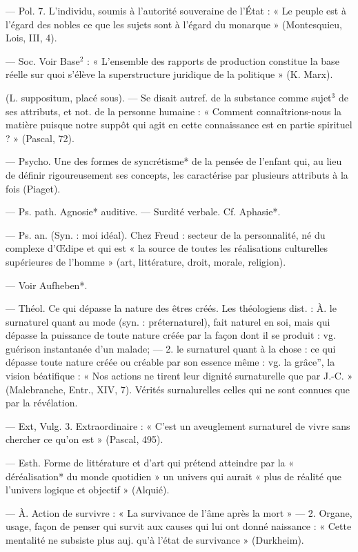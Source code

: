 \begin{itemize}[leftmargin=1cm, label=, itemsep=1pt]
— Pol. 7. L’individu, soumis à
l'autorité souveraine de l'État : « Le
peuple est à l’égard des nobles ce
que les sujets sont à l'égard du
monarque » (Montesquieu, Lois,
III, 4).

 — Soc. Voir Base$^2$ :
« L'ensemble des rapports de production constitue la base réelle sur
quoi s'élève la superstructure juridique de la politique » (K. Marx).

 (L. suppositum, placé sous). —
Se disait autref. de la substance
comme sujet$^3$ de ses attributs, et
not. de la personne humaine : « Comment connaîtrions-nous la matière
puisque notre suppôt qui agit en
cette connaissance est en partie spirituel ? » (Pascal, 72).

 — Psycho. Une des
formes de syncrétisme* de la pensée
de l'enfant qui, au lieu de définir
rigoureusement ses concepts, les
caractérise par plusieurs attributs à
la fois (Piaget).

 — Ps. path. Agnosie* auditive. — Surdité verbale. Cf.
Aphasie*.

 — Ps. an. (Syn. : moi idéal).
Chez Freud : secteur de la personnalité, né du complexe d'Œdipe et
qui est « la source de toutes les réalisations culturelles supérieures de
l’homme » (art, littérature, droit,
morale, religion).

 — Voir Aufheben*.

 — Théol. Ce qui dépasse
la nature des êtres créés. Les théologiens dist. : À. le surnaturel quant
au mode (syn. : préternaturel), fait
naturel en soi, mais qui dépasse la
puissance de toute nature créée
par la façon dont il se produit : vg.
guérison instantanée d'un malade;
— 2. le surnaturel quant à la chose :
ce qui dépasse toute nature créée ou
créable par son essence même : vg.
la grâce”, la vision béatifique : « Nos
actions ne tirent leur dignité surnaturelle que par J.-C. » (Malebranche, Entr., XIV, 7). Vérités
surnalurelles celles qui ne sont
connues que par la révélation.

— Ext, Vulg. 3. Extraordinaire :
« C'est un aveuglement surnaturel
de vivre sans chercher ce qu'on est »
(Pascal, 495).

 — Esth. Forme de littérature et d'art qui prétend atteindre
par la « déréalisation* du monde
quotidien » un univers qui aurait
« plus de réalité que l’univers logique et objectif » (Alquié).

 — À. Action de survivre :
« La survivance de l'âme après la
mort » — 2. Organe, usage, façon
de penser qui survit aux causes qui
lui ont donné naissance : « Cette
mentalité ne subsiste plus auj. qu’à
l'état de survivance » (Durkheim).


\end{itemize}
